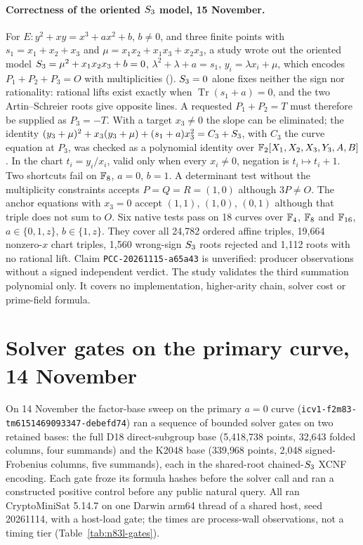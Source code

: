 \paragraph{Correctness of the oriented $S_{3}$ model, 15 November.} For
$E\colon y^2+xy=x^3+ax^2+b$, $b\ne0$, and three finite points with
$s_1=x_1+x_2+x_3$ and $\mu=x_1x_2+x_1x_3+x_2x_3$, a study wrote out the
oriented model $S_{3}=\mu^2+x_1x_2x_3+b=0$, $\lambda^2+\lambda+a=s_1$,
$y_i=\lambda x_i+\mu$, which encodes $P_1+P_2+P_3=O$ with multiplicities
(). $S_{3}=0$ alone
fixes neither the sign nor rationality: rational lifts exist exactly when
$\operatorname{Tr}(s_1+a)=0$, and the two Artin--Schreier roots give opposite
lines. A requested $P_1+P_2=T$ must therefore be supplied as $P_3=-T$. With a
target $x_3\ne0$ the slope can be eliminated; the identity
$(y_3+\mu)^2+x_3(y_3+\mu)+(s_1+a)x_3^2=C_3+S_{3}$, with $C_3$ the curve
equation at $P_3$, was checked as a polynomial identity over
$\mathbb{F}_2[X_1,X_2,X_3,Y_3,A,B]$. In the chart $t_i=y_i/x_i$, valid only when every
$x_i\ne0$, negation is $t_i\mapsto t_i+1$. Two shortcuts fail on
$\mathbb{F}_8$, $a=0$, $b=1$. A determinant test without the multiplicity constraints
accepts $P=Q=R=(1,0)$ although $3P\ne O$. The anchor equations with $x_3=0$
accept $(1,1)$, $(1,0)$, $(0,1)$ although that triple does not sum to $O$.
Six native tests pass on 18 curves over $\mathbb{F}_4$, $\mathbb{F}_8$ and $\mathbb{F}_{16}$,
$a\in\{0,1,z\}$, $b\in\{1,z\}$. They cover all 24{,}782 ordered affine triples,
19{,}664 nonzero-$x$ chart triples, 1{,}560 wrong-sign $S_{3}$ roots rejected
and 1{,}112 roots with no rational lift. Claim \texttt{PCC-20261115-a65a43} is
unverified: producer observations without a signed independent verdict. The
study validates the third summation polynomial only. It covers no
implementation, higher-arity chain, solver cost or prime-field formula.

\section{Solver gates on the primary curve, 14 November}\label{sec:n83l-gates}

On 14 November the factor-base sweep on the primary $a=0$ curve
(\texttt{icv1-f2m83-tm6151469093347-debefd74}) ran a sequence of bounded
solver gates on two retained bases: the full D18 direct-subgroup base
(5{,}418{,}738 points, 32{,}643 folded columns, four summands) and the K2048
base (339{,}968 points, 2{,}048 signed-Frobenius columns, five summands),
each in the shared-root chained-$S_{3}$ XCNF encoding. Each gate froze its
formula hashes before the solver call and ran a constructed positive
control before any public natural query. All ran CryptoMiniSat 5.14.7 on one
Darwin arm64 thread of a shared host, seed 20261114, with a host-load gate;
the times are process-wall observations, not a timing tier
(Table~\ref{tab:n83l-gates}).

